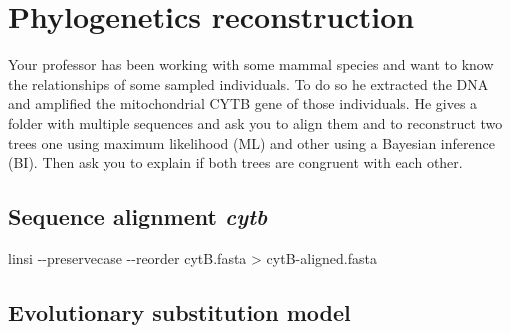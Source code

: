 \documentclass[
  letterpaper,
  DIV=11,
  numbers=noendperiod]{scrreprt}
\newenvironment{Shaded}{\begin{snugshade}}{\end{snugshade}}
\newcommand{\AttributeTok}[1]{\textcolor[rgb]{0.40,0.46,0.14}{#1}}
\newcommand{\ExtensionTok}[1]{\textcolor[rgb]{0.00,0.46,0.62}{#1}}
\newcommand{\NormalTok}[1]{\textcolor[rgb]{0.00,0.46,0.62}{#1}}
\newcommand{\OperatorTok}[1]{\textcolor[rgb]{0.37,0.37,0.37}{#1}}
\begin{document}
\hypertarget{phylogenetics-reconstruction}{%
\chapter{Phylogenetics
reconstruction}\label{phylogenetics-reconstruction}}

\begin{tcolorbox}[standard jigsaw,toptitle=1mm, colback=white, opacitybacktitle=0.6, title=\textcolor{quarto-callout-warning-color}{\faExclamationTriangle}\hspace{0.5em}{Challenge}, toprule=.15mm, bottomtitle=1mm, colbacktitle=quarto-callout-warning-color!10!white, titlerule=0mm, arc=.35mm, colframe=quarto-callout-warning-color-frame, rightrule=.15mm, opacityback=0, bottomrule=.15mm, leftrule=.75mm, coltitle=black, left=2mm]
Your professor has been working with some mammal species and want to
know the relationships of some sampled individuals. To do so he
extracted the DNA and amplified the mitochondrial CYTB gene of those
individuals. He gives a folder with multiple sequences and ask you to
align them and to reconstruct two trees one using maximum likelihood
(ML) and other using a Bayesian inference (BI). Then ask you to explain
if both trees are congruent with each other.
\end{tcolorbox}

\hypertarget{sequence-alignment-cytb}{%
\section*{\texorpdfstring{Sequence alignment
\emph{cytb}}{Sequence alignment cytb}}\label{sequence-alignment-cytb}}

\begin{Shaded}
\begin{Highlighting}[]
\ExtensionTok{linsi} \AttributeTok{{-}{-}preservecase} \AttributeTok{{-}{-}reorder}\NormalTok{ cytB.fasta }\OperatorTok{\textgreater{}}\NormalTok{ cytB{-}aligned.fasta}
\end{Highlighting}
\end{Shaded}

\hypertarget{evolutionary-substitution-model}{%
\section*{Evolutionary substitution
model}\label{evolutionary-substitution-model}}
\end{document}
